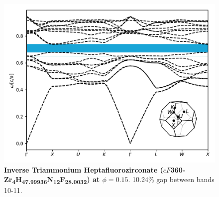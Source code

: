 \documentclass[fleqn,amsmath,amssymb,superscriptaddress, reprint,prl]{revtex4-1}
\begin{document}
\begin{figure}
\includegraphics[width=0.9\linewidth]{workspace/3ffc901f4c1607eca63b3dc75b3927e0/images/r=18.pdf}
	\caption{\textbf{Inverse Triammonium Heptafluorozirconate ($cF$360-Zr\textsubscript{4}H\textsubscript{4}\textsubscript{7}\textsubscript{.}\textsubscript{9}\textsubscript{9}\textsubscript{9}\textsubscript{3}\textsubscript{6}N\textsubscript{1}\textsubscript{2}F\textsubscript{2}\textsubscript{8}\textsubscript{.}\textsubscript{0}\textsubscript{0}\textsubscript{3}\textsubscript{2}) at $\phi=0.15$}. 10.24\% gap between bands 10-11.}
\end{figure}
\end{document}
